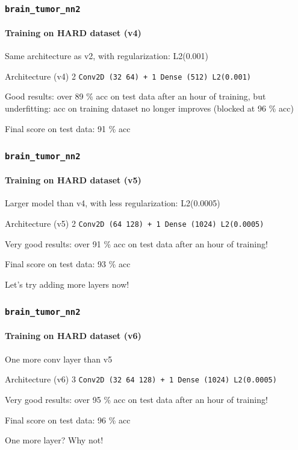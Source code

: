 \documentclass[]{beamer}
\newcommand{\btnt}{\tt{brain\_tumor\_nn2}}
\begin{document}
\begin{frame}
  \frametitle{\btnt}
  \framesubtitle{Training on HARD dataset (v4)}

  Same architecture as v2, with regularization: \alert{L2(0.001)}

  \begin{exampleblock}{Architecture (v4)}
    2 \tt{Conv2D} (32 64) + 1 \tt{Dense} (512) \hfill \alert{L2(0.001)}
  \end{exampleblock}

  Good results: over \alert{89 \% acc} on test data after an hour of training, but \alert{underfitting}: acc on training dataset no longer improves (blocked at \alert{96 \% acc})

  \medskip

  Final score on test data: \alert{91 \% acc}
\end{frame}

\begin{frame}
  \frametitle{\btnt}
  \framesubtitle{Training on HARD dataset (v5)}

  Larger model than v4, with less regularization: \alert{L2(0.0005)}

  \begin{exampleblock}{Architecture (v5)}
    2 \tt{Conv2D} (64 128) + 1 \tt{Dense} (1024) \hfill \alert{L2(0.0005)}
  \end{exampleblock}

  Very good results: over \alert{91 \% acc} on test data after an hour of training!

  \medskip

  Final score on test data: \alert{93 \% acc}
  \bigskip

  Let's try adding \alert{more layers} now!
\end{frame}

\begin{frame}
  \frametitle{\btnt}
  \framesubtitle{Training on HARD dataset (v6)}

  One more conv layer than v5

  \begin{exampleblock}{Architecture (v6)}
    3 \tt{Conv2D} (32 64 128) + 1 \tt{Dense} (1024) \hfill \alert{L2(0.0005)}
  \end{exampleblock}

  Very good results: over \alert{95 \% acc} on test data after an hour of training!

  \medskip

  Final score on test data: \alert{96 \% acc}

  \bigskip

  One \alert{more layer}? Why not!
\end{frame}
\end{document}
